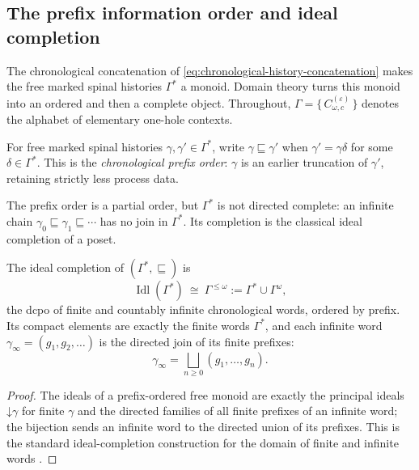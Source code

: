 \subsection{The prefix information order and ideal completion}

The chronological concatenation of \eqref{eq:chronological-history-concatenation}
makes the free marked spinal histories $\Gamma^*$ a monoid.  Domain theory turns
this monoid into an ordered and then a complete object.  Throughout,
$\Gamma=\{\,C_{\omega,c}^{(\varepsilon)}\,\}$ denotes the alphabet of elementary
one-hole contexts.

\begin{definition}
\label{def:prefix-information-order}
For free marked spinal histories $\gamma,\gamma'\in\Gamma^*$, write
$\gamma\sqsubseteq\gamma'$ when $\gamma'=\gamma\delta$ for some
$\delta\in\Gamma^*$.  This is the \emph{chronological prefix order}: $\gamma$ is
an earlier truncation of $\gamma'$, retaining strictly less process data.
\end{definition}

The prefix order is a partial order, but $\Gamma^*$ is not directed complete: an
infinite chain $\gamma_0\sqsubseteq\gamma_1\sqsubseteq\cdots$ has no join in
$\Gamma^*$.  Its completion is the classical ideal completion of a poset.

\begin{proposition}
\label{prop:spinal-ideal-completion}
The ideal completion of $(\Gamma^*,\sqsubseteq)$ is
\[
\operatorname{Idl}(\Gamma^*)\ \cong\ \Gamma^{\le\omega}:=\Gamma^*\cup\Gamma^\omega,
\]
the dcpo of finite and countably infinite chronological words, ordered by
prefix.  Its compact elements are exactly the finite words $\Gamma^*$, and each
infinite word $\gamma_\infty=(g_1,g_2,\ldots)$ is the directed join of its
finite prefixes:
\[
\gamma_\infty=\bigsqcup_{n\ge0}(g_1,\ldots,g_n).
\]
\end{proposition}

\begin{proof}
The ideals of a prefix-ordered free monoid are exactly the principal ideals
$\mathord\downarrow\gamma$ for finite $\gamma$ and the directed families of all
finite prefixes of an infinite word; the bijection sends an infinite word to the
directed union of its prefixes.  This is the standard ideal-completion
construction for the domain of finite and infinite words
\cite{Scott1972ContinuousLattices,GHKLM2003ContinuousLattices}.
\end{proof}

